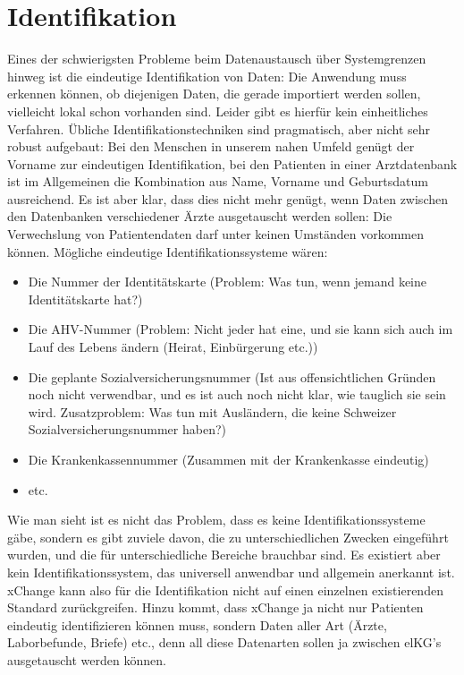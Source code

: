 \documentclass[a4paper]{scrartcl}
\begin{document}
\section{Identifikation}
 Eines der schwierigsten Probleme beim Datenaustausch über Systemgrenzen hinweg ist die eindeutige Identifikation von Daten: Die Anwendung muss erkennen können, ob diejenigen Daten, die gerade importiert werden sollen, vielleicht lokal schon vorhanden sind. Leider gibt es hierfür kein einheitliches Verfahren. Übliche Identifikationstechniken sind pragmatisch, aber nicht sehr robust aufgebaut: Bei den Menschen in unserem nahen Umfeld genügt der Vorname zur eindeutigen Identifikation, bei den Patienten in einer Arztdatenbank ist im Allgemeinen die Kombination aus Name, Vorname und Geburtsdatum ausreichend. Es ist aber klar, dass dies nicht mehr genügt, wenn Daten zwischen den Datenbanken verschiedener Ärzte ausgetauscht werden sollen: Die Verwechslung von Patientendaten darf unter keinen Umständen vorkommen können. Mögliche eindeutige Identifikationssysteme wären:
 \begin{itemize}
 \item Die Nummer der Identitätskarte (Problem: Was tun, wenn jemand keine Identitätskarte hat?)
 \item Die AHV-Nummer (Problem: Nicht jeder hat eine, und sie kann sich auch im Lauf des Lebens ändern (Heirat, Einbürgerung etc.))
 \item Die geplante Sozialversicherungsnummer (Ist aus offensichtlichen Gründen noch nicht verwendbar, und es ist auch noch nicht klar, wie tauglich sie sein wird. Zusatzproblem: Was tun mit Ausländern, die keine Schweizer Sozialversicherungsnummer haben?)
 \item Die Krankenkassennummer (Zusammen mit der Krankenkasse eindeutig)
 \item etc.
  \end{itemize}

 Wie man sieht ist es nicht das Problem, dass es keine Identifikationssysteme gäbe, sondern es gibt zuviele davon, die zu unterschiedlichen Zwecken eingeführt wurden, und die für unterschiedliche Bereiche brauchbar sind. Es existiert aber kein Identifikationssystem, das universell anwendbar und allgemein anerkannt ist. xChange kann also für die Identifikation nicht auf einen einzelnen existierenden Standard zurückgreifen. Hinzu kommt, dass xChange ja nicht nur Patienten eindeutig identifizieren können muss, sondern Daten aller Art (Ärzte, Laborbefunde, Briefe) etc., denn all diese Datenarten sollen ja zwischen elKG's ausgetauscht werden können.
\end{document}
